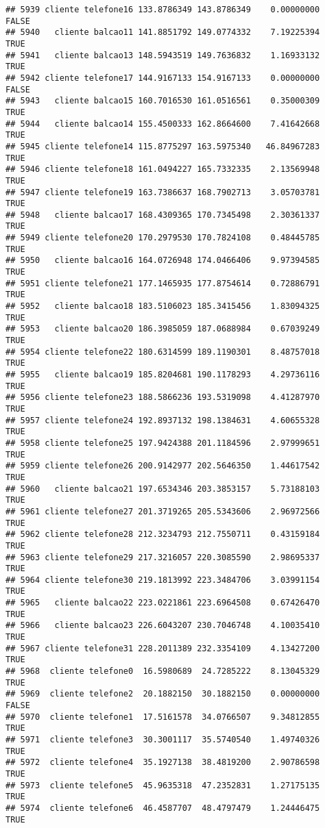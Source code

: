 \documentclass[
]{article}
\begin{document}
\begin{verbatim}
## 5939 cliente telefone16 133.8786349 143.8786349    0.00000000    FALSE
## 5940   cliente balcao11 141.8851792 149.0774332    7.19225394     TRUE
## 5941   cliente balcao13 148.5943519 149.7636832    1.16933132     TRUE
## 5942 cliente telefone17 144.9167133 154.9167133    0.00000000    FALSE
## 5943   cliente balcao15 160.7016530 161.0516561    0.35000309     TRUE
## 5944   cliente balcao14 155.4500333 162.8664600    7.41642668     TRUE
## 5945 cliente telefone14 115.8775297 163.5975340   46.84967283     TRUE
## 5946 cliente telefone18 161.0494227 165.7332335    2.13569948     TRUE
## 5947 cliente telefone19 163.7386637 168.7902713    3.05703781     TRUE
## 5948   cliente balcao17 168.4309365 170.7345498    2.30361337     TRUE
## 5949 cliente telefone20 170.2979530 170.7824108    0.48445785     TRUE
## 5950   cliente balcao16 164.0726948 174.0466406    9.97394585     TRUE
## 5951 cliente telefone21 177.1465935 177.8754614    0.72886791     TRUE
## 5952   cliente balcao18 183.5106023 185.3415456    1.83094325     TRUE
## 5953   cliente balcao20 186.3985059 187.0688984    0.67039249     TRUE
## 5954 cliente telefone22 180.6314599 189.1190301    8.48757018     TRUE
## 5955   cliente balcao19 185.8204681 190.1178293    4.29736116     TRUE
## 5956 cliente telefone23 188.5866236 193.5319098    4.41287970     TRUE
## 5957 cliente telefone24 192.8937132 198.1384631    4.60655328     TRUE
## 5958 cliente telefone25 197.9424388 201.1184596    2.97999651     TRUE
## 5959 cliente telefone26 200.9142977 202.5646350    1.44617542     TRUE
## 5960   cliente balcao21 197.6534346 203.3853157    5.73188103     TRUE
## 5961 cliente telefone27 201.3719265 205.5343606    2.96972566     TRUE
## 5962 cliente telefone28 212.3234793 212.7550711    0.43159184     TRUE
## 5963 cliente telefone29 217.3216057 220.3085590    2.98695337     TRUE
## 5964 cliente telefone30 219.1813992 223.3484706    3.03991154     TRUE
## 5965   cliente balcao22 223.0221861 223.6964508    0.67426470     TRUE
## 5966   cliente balcao23 226.6043207 230.7046748    4.10035410     TRUE
## 5967 cliente telefone31 228.2011389 232.3354109    4.13427200     TRUE
## 5968  cliente telefone0  16.5980689  24.7285222    8.13045329     TRUE
## 5969  cliente telefone2  20.1882150  30.1882150    0.00000000    FALSE
## 5970  cliente telefone1  17.5161578  34.0766507    9.34812855     TRUE
## 5971  cliente telefone3  30.3001117  35.5740540    1.49740326     TRUE
## 5972  cliente telefone4  35.1927138  38.4819200    2.90786598     TRUE
## 5973  cliente telefone5  45.9635318  47.2352831    1.27175135     TRUE
## 5974  cliente telefone6  46.4587707  48.4797479    1.24446475     TRUE

\end{verbatim}
\end{document}
